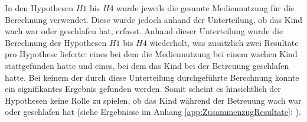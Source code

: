 In den Hypothesen $H1$ bis $H4$ wurde jeweils die gesamte Mediennutzung für die Berechnung verwendet. Diese wurde jedoch anhand der Unterteilung, ob das Kind wach war oder geschlafen hat, erfasst. Anhand dieser Unterteilung wurde die Berechnung der Hypothesen $H1$ bis $H4$ wiederholt, was zusätzlich zwei Resultate pro Hypothese lieferte: eines bei dem die Mediennutzung bei einem wachen Kind stattgefunden hatte und eines, bei dem das Kind bei der Betreuung geschlafen hatte. Bei keinem der durch diese Unterteilung durchgeführte Berechnung konnte ein signifikantes Ergebnis gefunden werden. Somit scheint es hinsichtlich der Hypothesen keine Rolle zu spielen, ob das Kind während der Betreuung wach war oder geschlafen hat (siehe Ergebnisse im Anhang \ref{app:ZusammenzugResultate}: \textit{}).

